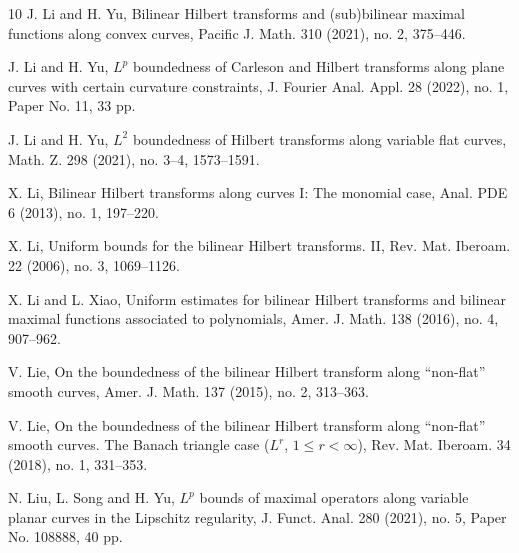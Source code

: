 \documentclass[11pt, twoside, leqno]{article}
\theoremstyle{definition}
\numberwithin{equation}{section}
\begin{document}
\begin{thebibliography}{10}
 J. Li and H. Yu, Bilinear Hilbert transforms and (sub)bilinear maximal functions along convex curves, Pacific J. Math. 310 (2021), no. 2, 375--446.

\vspace{-.3cm}

 J. Li and H. Yu, $L^p$ boundedness of Carleson and Hilbert transforms along plane curves with certain curvature constraints, J. Fourier Anal. Appl. 28 (2022), no. 1, Paper No. 11, 33 pp.

\vspace{-.3cm}

 J. Li and H. Yu, $L^2$ boundedness of Hilbert transforms along variable flat curves, Math. Z. 298 (2021), no. 3--4, 1573--1591.

\vspace{-.3cm}

 X. Li, Bilinear Hilbert transforms along curves I: The monomial case, Anal. PDE 6 (2013), no. 1, 197--220.

\vspace{-.3cm}

 X. Li, Uniform bounds for the bilinear Hilbert transforms. II, Rev. Mat. Iberoam. 22 (2006), no. 3, 1069--1126.

\vspace{-.3cm}

 X. Li and L. Xiao, Uniform estimates for bilinear Hilbert transforms and bilinear maximal functions associated to polynomials, Amer. J. Math. 138 (2016), no. 4, 907--962.

\vspace{-.3cm}

 V. Lie, On the boundedness of the bilinear Hilbert transform along ``non-flat'' smooth curves, Amer. J. Math. 137 (2015), no. 2, 313--363.

\vspace{-.3cm}

 V. Lie, On the boundedness of the bilinear Hilbert transform along ``non-flat'' smooth curves. The Banach triangle case ($L^r$, $1\leq r<\infty$), Rev. Mat. Iberoam. 34 (2018), no. 1, 331--353.

\vspace{-.3cm}

 N. Liu, L. Song and H. Yu, $L^p$ bounds of maximal operators along variable planar curves in the Lipschitz regularity, J. Funct. Anal. 280 (2021), no. 5, Paper No. 108888, 40 pp.


\end{thebibliography}
\end{document}
